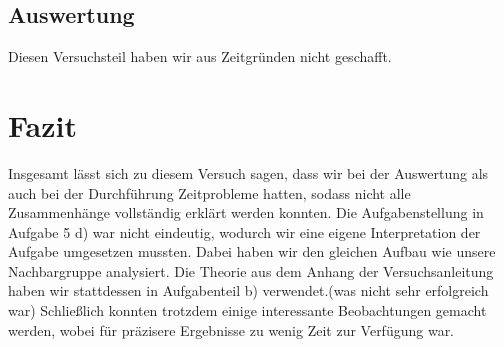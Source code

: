 \documentclass[12pt]{scrartcl}
\begin{document}
\subsection{Auswertung}
Diesen Versuchsteil haben wir aus Zeitgründen nicht geschafft.


\section{Fazit}
Insgesamt lässt sich zu diesem Versuch sagen, dass wir bei der Auswertung als auch bei der Durchführung Zeitprobleme hatten, sodass nicht alle Zusammenhänge vollständig erklärt werden konnten. Die Aufgabenstellung in Aufgabe 5 d)
war nicht eindeutig, wodurch wir eine eigene Interpretation der Aufgabe umgesetzen mussten.
Dabei haben wir den gleichen Aufbau wie unsere Nachbargruppe analysiert.
Die Theorie aus dem Anhang der Versuchsanleitung haben wir stattdessen in Aufgabenteil b) verwendet.(was nicht sehr erfolgreich war)
Schließlich konnten trotzdem einige interessante Beobachtungen gemacht werden, wobei für präzisere Ergebnisse zu wenig Zeit zur Verfügung war.
\end{document}
